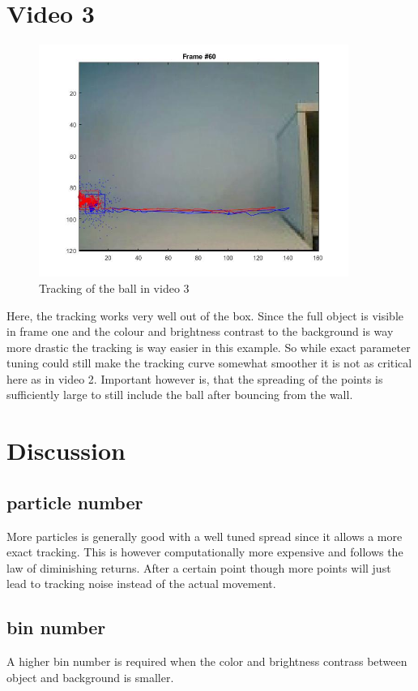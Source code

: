 \documentclass[12pt]{article}
\begin{document}
\section{Video 3}
\begin{figure}[H]
	\centering
	\includegraphics[width=0.9\textwidth]{vid3.jpg}
	\caption{Tracking of the ball in video 3}
	\label{fig1}
\end{figure}
Here, the tracking works very well out of the box. Since the full object is visible in frame one and the colour and brightness contrast to the background is way more drastic the tracking is way easier in this example. So while exact parameter tuning could still make the tracking curve somewhat smoother it is not as critical here as in video 2. Important however is, that the spreading of the points is sufficiently large to still include the ball after bouncing from the wall. 


\section{Discussion}
\subsection{particle number}
More particles is generally good with a well tuned spread since it allows a more exact tracking. This is however computationally more expensive and follows the law of diminishing returns. After a certain point though more points will just lead to tracking noise instead of the actual movement. 
\subsection{bin number}
A higher bin number is required when the color and brightness contrass between object and background is smaller. 
\end{document}
